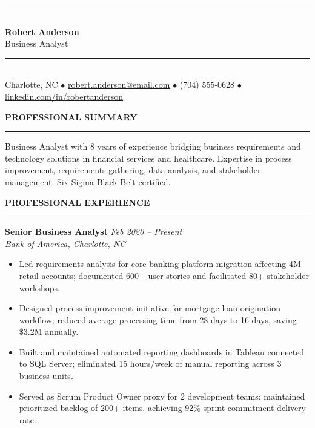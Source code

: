 \documentclass[11pt,a4paper]{article}
\begin{document}
\begin{center}
  \rule{\textwidth}{1.2pt}\\[4pt]
  {\LARGE \textbf{Robert Anderson}}\\[2pt]
  {\large Business Analyst}\\[4pt]
  \rule{\textwidth}{1.2pt}\\[3pt]
  Charlotte, NC \quad $\bullet$ \quad
  \href{mailto:robert.anderson@email.com}{robert.anderson@email.com} \quad $\bullet$ \quad
  (704) 555-0628 \quad $\bullet$ \quad
  \href{https://linkedin.com/in/robertanderson}{linkedin.com/in/robertanderson}
\end{center}

\vspace{6pt}
\begin{center}\textbf{PROFESSIONAL SUMMARY}\end{center}
\rule{\textwidth}{0.4pt}

\noindent Business Analyst with 8 years of experience bridging business requirements and technology solutions in financial services and healthcare. Expertise in process improvement, requirements gathering, data analysis, and stakeholder management. Six Sigma Black Belt certified.

\vspace{6pt}
\begin{center}\textbf{PROFESSIONAL EXPERIENCE}\end{center}
\rule{\textwidth}{0.4pt}

\noindent\textbf{Senior Business Analyst} \hfill \textit{Feb 2020 -- Present}\\
\textit{Bank of America, Charlotte, NC}
\begin{itemize}
  \item Led requirements analysis for core banking platform migration affecting 4M retail accounts; documented 600+ user stories and facilitated 80+ stakeholder workshops.
  \item Designed process improvement initiative for mortgage loan origination workflow; reduced average processing time from 28 days to 16 days, saving \$3.2M annually.
  \item Built and maintained automated reporting dashboards in Tableau connected to SQL Server; eliminated 15 hours/week of manual reporting across 3 business units.
  \item Served as Scrum Product Owner proxy for 2 development teams; maintained prioritized backlog of 200+ items, achieving 92\% sprint commitment delivery rate.
\end{itemize}
\end{document}
